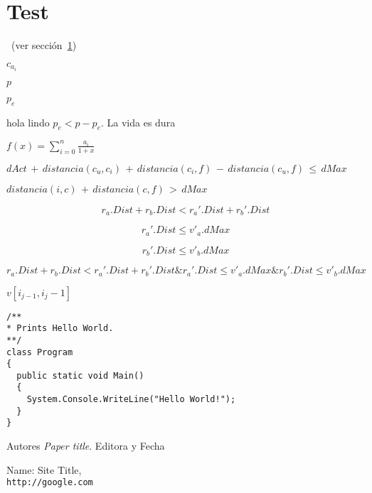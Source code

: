 
\chapter{Test}


\label{sec:brkga}
~(ver sección~\ref{sec:brkga})

$c_{a_i}$

$p$

$p_e$

hola lindo $p_e < p - p_e$. La vida es dura

\( f(x) = \sum_{i=0}^{n} \frac{a_i}{1+x} \)

\( dAct\, +\, distancia(c_u, c_i)\, +\, distancia(c_i, f)\, -\, distancia(c_u, f)\, \leq\, dMax\)

\( distancia(i, c)\, +\, distancia(c, f)\, >\, dMax\)


\begin{equation*}
r_a.Dist + r_b.Dist < r_a'.Dist + r_b'.Dist \nonumber
\end{equation*}

\begin{equation*}
r_a'.Dist \leq v'_a.dMax
\end{equation*}

\begin{equation*}
r_b'.Dist \leq v'_b.dMax
\end{equation*}

\( r_a.Dist + r_b.Dist < r_a'.Dist + r_b'.Dist \& r_a'.Dist \leq v'_a.dMax \& r_b'.Dist \leq v'_b.dMax \)

$v[i_{j-1}, i_j-1]$

\begin{lstlisting}
/**
* Prints Hello World.
**/
class Program
{
  public static void Main()
  {
    System.Console.WriteLine("Hello World!");
  }
}
\end{lstlisting}


Autores
\textit{Paper title}. 
Editora y Fecha
 
Name: Site Title,
\\\texttt{http://google.com}